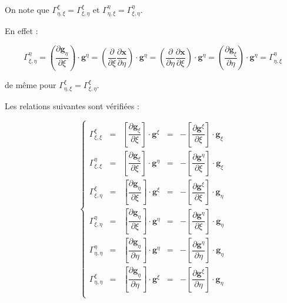 \begin{remarque}
On note que $\Gamma_{\eta,\xi}^{\xi}=\Gamma_{\xi,\eta}^{\xi}$ et $\Gamma_{\eta,\xi}^{\eta}=\Gamma_{\xi,\eta}^{\eta}$.

En effet :

$$\Gamma_{\xi, \eta}^{\eta} = \left( \dfrac{\partial \mathbf{g}_{\eta}}{\partial \xi} \right) \cdot \mathbf{g}^{\eta} = \left( \dfrac{\partial}{\partial \xi} \dfrac{\partial \mathbf{x}}{\partial \eta} \right) \cdot \mathbf{g}^{\eta} = \left( \dfrac{\partial}{\partial \eta} \dfrac{\partial \mathbf{x}}{\partial \xi} \right) \cdot \mathbf{g}^{\eta} = \left( \dfrac{\partial \mathbf{g}_{\xi}}{\partial \eta} \right) \cdot \mathbf{g}^{\eta} = \Gamma_{\eta, \xi}^{\eta}$$

de même pour $\Gamma_{\eta,\xi}^{\xi}=\Gamma_{\xi,\eta}^{\xi}$.
\end{remarque}




\begin{proposition}
Les relations suivantes sont vérifiées :

\begin{equation}
\left\lbrace
\begin{array}{rcccl}
\Gamma_{\xi,\xi}^{\xi} & = & \left[ \dfrac{\partial \mathbf{g}_{\xi}}{\partial \xi} \right] \cdot \mathbf{g}^{\xi} & = & - \left[ \dfrac{\partial \mathbf{g}^{\xi}}{\partial \xi} \right] \cdot \mathbf{g}_ {\xi}\\

\Gamma_{\xi,\xi}^{\eta} & = & \left[ \dfrac{\partial \mathbf{g}_{\xi}}{\partial \xi} \right] \cdot \mathbf{g}^{\eta} & = & - \left[ \dfrac{\partial \mathbf{g}^{\eta}}{\partial \xi} \right] \cdot \mathbf{g}_ {\xi}\\

\Gamma_{\xi,\eta}^{\xi} & = & \left[ \dfrac{\partial \mathbf{g}_{\eta}}{\partial \xi} \right] \cdot \mathbf{g}^{\xi} & = & - \left[ \dfrac{\partial \mathbf{g}^{\xi}}{\partial \xi} \right] \cdot \mathbf{g}_ {\eta}\\

\Gamma_{\xi,\eta}^{\eta} & = & \left[ \dfrac{\partial \mathbf{g}_{\eta}}{\partial \xi} \right] \cdot \mathbf{g}^{\eta} & = & - \left[ \dfrac{\partial \mathbf{g}^{\eta}}{\partial \xi} \right] \cdot \mathbf{g}_ {\eta}\\

\Gamma_{\eta,\eta}^{\eta} & = & \left[ \dfrac{\partial \mathbf{g}_{\eta}}{\partial \eta} \right] \cdot \mathbf{g}^{\eta} & = & - \left[ \dfrac{\partial \mathbf{g}^{\eta}}{\partial \eta} \right] \cdot \mathbf{g}_ {\eta}\\

\Gamma_{\eta,\eta}^{\xi} & = & \left[ \dfrac{\partial \mathbf{g}_{\eta}}{\partial \eta} \right] \cdot \mathbf{g}^{\xi} & = & - \left[ \dfrac{\partial \mathbf{g}^{\xi}}{\partial \eta} \right] \cdot \mathbf{g}_ {\eta}\\
\end{array}
\right.
\end{equation}
\end{proposition}

